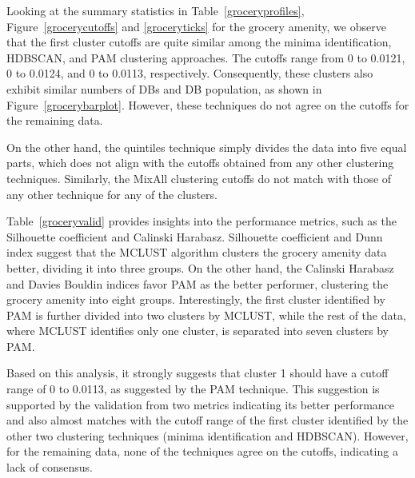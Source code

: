 \documentclass[11pt, a4paper]{article}
\begin{document}
Looking at the summary statistics in Table~\ref{groceryprofiles}, Figure~\ref{grocerycutoffs} and \ref{groceryticks} for the grocery amenity, we observe that the first cluster cutoffs are quite similar among the minima identification, HDBSCAN, and PAM clustering approaches. The cutoffs range from 0 to 0.0121, 0 to 0.0124, and 0 to 0.0113, respectively. Consequently,  these clusters also exhibit similar numbers of DBs and DB population, as shown in Figure~\ref{grocerybarplot}. However, these techniques do not agree on the cutoffs for the remaining data.
\par
On the other hand, the quintiles technique simply divides the data into five equal parts, which does not align with the cutoffs obtained from any other clustering techniques. Similarly, the MixAll clustering cutoffs do not match with those of any other technique for any of the clusters.
\par
Table~\ref{groceryvalid} provides insights into the performance metrics, such as the Silhouette coefficient and Calinski Harabasz. Silhouette coefficient and Dunn index suggest that the MCLUST algorithm clusters the grocery amenity data better, dividing it into three groups. On the other hand, the Calinski Harabasz and Davies Bouldin indices favor PAM as the better performer, clustering the grocery amenity into eight groups. Interestingly, the first cluster identified by PAM is further divided into two clusters by MCLUST, while the rest of the data, where MCLUST identifies only one cluster, is separated into seven clusters by PAM.
\par
Based on this analysis, it strongly suggests that cluster 1 should have a cutoff range of 0 to 0.0113, as suggested by the PAM technique. This suggestion is supported by the validation from two metrics indicating its better performance and also almost matches with the cutoff range of the first cluster identified by the other two clustering techniques (minima identification and HDBSCAN). However, for the remaining data, none of the techniques agree on the cutoffs, indicating a lack of consensus.
\end{document}
